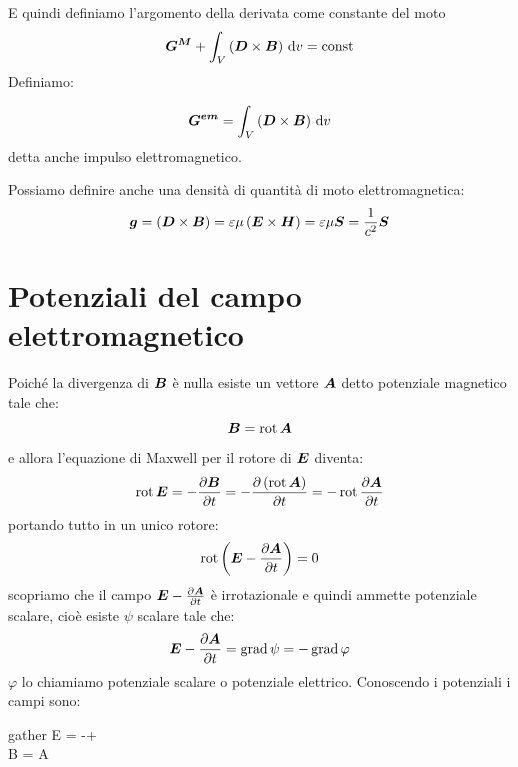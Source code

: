 E quindi definiamo l'argomento della derivata come constante del moto
\begin{equation}
  \boldsymbol{G^M}+\int_V\left(\boldsymbol{D}\times\boldsymbol{B}\right)\,\mathrm{d} v=\boldsymbol{\text{const}}
\end{equation}
Definiamo:
\begin{Def}
  \begin{equation}
    \boldsymbol{G^{em}}=\int_V\left(\boldsymbol{D}\times\boldsymbol{B}\right)\,\mathrm{d} v
  \end{equation}
  detta anche impulso elettromagnetico.
\end{Def}
Possiamo definire anche una densità di quantità di moto elettromagnetica:
\begin{equation}
  \boldsymbol{g}=\left(\boldsymbol{D}\times\boldsymbol{B}\right)=\varepsilon\mu\left(\boldsymbol{E}\times\boldsymbol{H}\right)=\varepsilon\mu\boldsymbol{S}=\frac{1}{c^2}\boldsymbol{S}
\end{equation}
\section{Potenziali del campo elettromagnetico}
Poiché la divergenza di $\boldsymbol{B}$ è nulla esiste un vettore $\boldsymbol{A}$ detto potenziale magnetico tale che:
\begin{equation}
  \boldsymbol{B}=\operatorname{rot}\boldsymbol{A}
  \label{ppp02}
\end{equation}
e allora l'equazione di Maxwell per il rotore di $\boldsymbol{E}$ diventa:
\begin{equation}
  \operatorname{rot}\boldsymbol{E}=-\frac{\partial\boldsymbol{B}}{\partial t}=-\frac{\partial\left(\operatorname{rot}\boldsymbol{A}\right)}{\partial t}=-\operatorname{rot}\frac{\partial\boldsymbol{A}}{\partial t}
\end{equation}
portando tutto in un unico rotore:
\begin{equation}
  \operatorname{rot}\left(\boldsymbol{E}-\frac{\partial \boldsymbol{A}}{\partial t}\right)=0
\end{equation}
scopriamo che il campo $\boldsymbol{E}-\frac{\partial \boldsymbol{A}}{\partial t}$ è irrotazionale e quindi ammette potenziale scalare, cioè esiste $\psi$ scalare tale che:
\begin{equation}
  \boldsymbol{E}-\frac{\partial \boldsymbol{A}}{\partial t}=\operatorname{grad}\psi=-\operatorname{grad}\varphi
  \label{ppp01}
\end{equation}
$\varphi$ lo chiamiamo potenziale scalare o potenziale elettrico. Conoscendo i potenziali i campi sono:
\begin{eqimp}{gather}
  \ve E = -\grad\varphi+\\
  \ve B = \rot\ve A
\end{eqimp}

